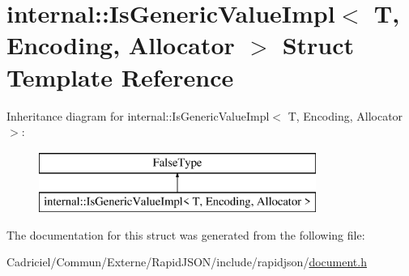\hypertarget{structinternal_1_1_is_generic_value_impl}{}\section{internal\+:\+:Is\+Generic\+Value\+Impl$<$ T, Encoding, Allocator $>$ Struct Template Reference}
\label{structinternal_1_1_is_generic_value_impl}
Inheritance diagram for internal\+:\+:Is\+Generic\+Value\+Impl$<$ T, Encoding, Allocator $>$\+:\begin{figure}[H]
\begin{center}
\leavevmode
\includegraphics[height=2.000000cm]{structinternal_1_1_is_generic_value_impl}
\end{center}
\end{figure}


The documentation for this struct was generated from the following file\+:\begin{DoxyCompactItemize}
\item 
Cadriciel/\+Commun/\+Externe/\+Rapid\+J\+S\+O\+N/include/rapidjson/\hyperlink{document_8h}{document.\+h}\end{DoxyCompactItemize}
